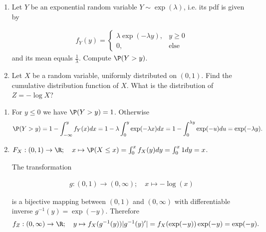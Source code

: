 
\begin{exercise}

\phantom{}

\begin{enumerate}[label = (\alph*)]
  \item Let $Y$ be an exponential random variable $Y \sim \exp(\lambda)$, i.e.
  its pdf is given by

  \begin{align*}
    f_Y(y) = \begin{cases}
      \lambda\exp(-\lambda y), & y \geq 0 \\
      0, & \text{else}
    \end{cases}
  \end{align*}
  and its mean equals $\frac{1}{\lambda}$. Compute $\P(Y > y)$.

  \item Let $X$ be a random variable, uniformly distributed on $(0,1)$.
  Find the cumulative distribution function of $X$. What is the distribution of
  $Z = - \log X$?
\end{enumerate}

\end{exercise}


\begin{solution}

\phantom{}

\begin{enumerate}[label = (\alph*)]
  \item For $y \leq 0$ we have $\P(Y > y) = 1$. Otherwise
  \begin{align*}
    \P(Y > y) = 1 - \int_{-\infty}^{y} f_Y(x) dx =
    1 - \lambda \int_{0}^{y} \exp(-\lambda x) dx =
    1 - \int_{0}^{\lambda y} \exp(-u) du = \exp( - \lambda y).
  \end{align*}

  \item $F_X: (0,1) \to \R; \quad x  \mapsto \P(X \leq x) = \int_0^x f_X(y) dy = \int_0^x 1 dy = x$.

  The transformation

  \begin{align*}
    g: (0,1) \to (0, \infty); \quad x \mapsto -\log(x)
  \end{align*}

  is a bijective mapping between $(0,1)$ and $(0,\infty)$ with differentiable
  inverse $g^{-1}(y) = \exp(-y)$. Therefore
  \begin{align*}
    f_Z: (0, \infty) \to \R; \quad y \mapsto f_X(g^{-1}(y))|g^{-1}(y)^{\prime}|
    = f_X(\exp(-y))\exp(-y) = \exp(-y).
  \end{align*}

\end{enumerate}

\end{solution}


